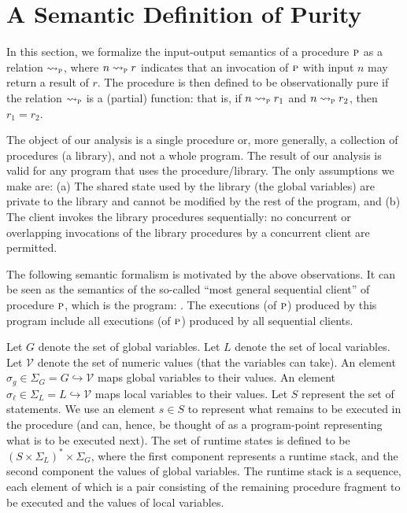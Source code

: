 
\newcommand{\vals}{\mathcal{V}}
\newcommand{\gvars}{G}
\newcommand{\lvars}{L}
\newcommand{\gmap}{\sigma_g}
\newcommand{\gmaps}{\Sigma_G}
\newcommand{\lstate}{\sigma_\ell}
\newcommand{\lstates}{\Sigma_L}
\newcommand{\cstates}{S}
\newcommand{\cont}{s}
\newcommand{\lstack}{\gamma}
\newcommand{\initstate}{\sigma_{\text{init}}}


\newcommand{\iosem}[1]{\rightsquigarrow_{#1}}
\newcommand{\iosemP}{\iosem{\proc}}
\newcommand{\sssem}[1]{\rightarrow_{#1}}
\newcommand{\sssemP}{\sssem{\proc}}

\section{A Semantic Definition of Purity}

In this section, we formalize the input-output semantics of a procedure $\textsc{p}$ as a relation $\iosem{\proc}$,
where $n \iosem{\proc} r$ indicates that an invocation of $\textsc{p}$ with input $n$ may return a result of $r$.
The procedure is then defined to be observationally pure if the relation $\iosem{\proc}$ is a (partial) function:
that is, if  $n \iosem{\proc} r_1$ and $n \iosem{\proc} r_2$, then $r_1 = r_2$.

The object of our analysis is a single procedure or, more generally, a collection of procedures (a library),
and not a whole program. The result of our analysis is valid for any program that uses the procedure/library.
The only assumptions we make are: (a) The shared state used by the library (the global variables) are private
to the library and cannot be modified by the rest of the program, and (b) The client invokes the library
procedures sequentially: no concurrent or overlapping invocations of the library procedures by a concurrent
client are permitted.

The following semantic formalism is motivated by the above observations. It can be seen as the semantics
of the so-called ``most general sequential client'' of procedure $\textsc{p}$, which is the program:
.
The executions (of $\textsc{p}$) produced by this program include all executions (of $\textsc{p}$)  produced by all
sequential clients.

Let $\gvars$ denote the set of global variables. Let $\lvars$ denote the set of local variables.
Let $\vals$ denote the set of numeric values (that the variables can take).
An element $\gmap \in \gmaps = \gvars \hookrightarrow \vals$ maps global variables to their values.
An element $\lstate \in \lstates = \lvars \hookrightarrow \vals$ maps local variables to their values.
Let $\cstates$ represent the set of statements. We use an element $\cont \in \cstates$ to represent
what remains to be executed in the procedure (and can, hence, be thought of as a program-point
representing what is to be executed next).
The set of runtime states is defined to be $(\cstates \times \lstates)^* \times \gmaps$, where
the first component represents a runtime stack, and the second component the values of global
variables. The runtime stack is a sequence, each element of which is a pair consisting of the
remaining procedure fragment to be executed and the values of local variables.


